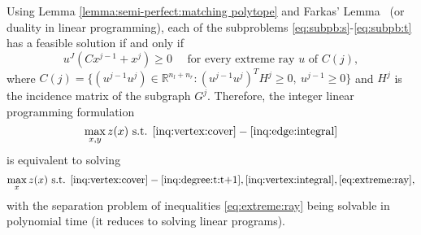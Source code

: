 Using Lemma \ref{lemma:semi-perfect:matching polytope} and Farkas'
Lemma~\cite{farkas1902} (or duality in linear programming), each of
the subproblems \eqref{eq:subpb:s}-\eqref{eq:subpb:t} has a feasible
solution if and only if
\begin{equation} \label{eq:extreme:ray}
 u^J(Cx^{j-1} + x^j) \geq 0
  \quad \textrm{ for every extreme ray } u \textrm{ of } C(j),
\end{equation}
where $C(j) = \{(u^{j-1} u^j) \in \mathbb{R}^{n_l+n_r} : (u^{j-1}
u^j)^TH^j \geq 0,\ u^{j-1} \geq 0\}$ and $H^j$ is the incidence matrix
of the subgraph $G^j$.  Therefore, the integer linear programming
formulation
\begin{equation*}
  \max\limits_{x,y} z(x) \textrm{ s.t. } \eqref{inq:vertex:cover}-\eqref{inq:edge:integral}
\end{equation*}
is equivalent to solving
\begin{equation*}
  \max\limits_{x} z(x) \textrm{ s.t. } \eqref{inq:vertex:cover}-\eqref{inq:degree:t:t+1},\eqref{inq:vertex:integral},\eqref{eq:extreme:ray},
\end{equation*}
with the separation problem of inequalities \eqref{eq:extreme:ray}
being solvable in polynomial time (it reduces to solving linear
programs).


